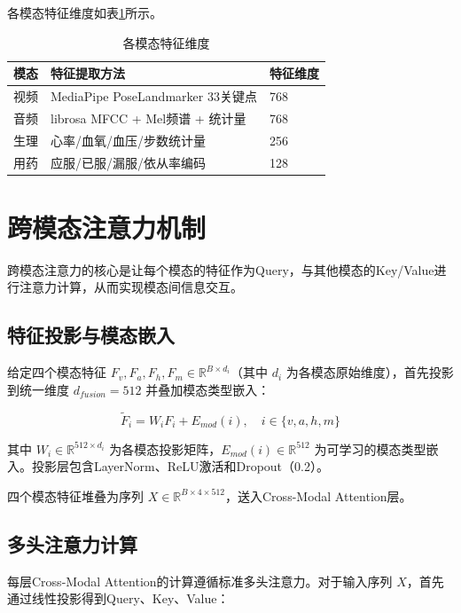 各模态特征维度如表\ref{tab:dims}所示。

\begin{table}[H]
\centering
\caption{各模态特征维度}
\label{tab:dims}
\begin{tabular}{lll}
\toprule
模态 & 特征提取方法 & 特征维度 \\
\midrule
视频 & MediaPipe PoseLandmarker 33关键点 & 768 \\
音频 & librosa MFCC + Mel频谱 + 统计量 & 768 \\
生理 & 心率/血氧/血压/步数统计量 & 256 \\
用药 & 应服/已服/漏服/依从率编码 & 128 \\
\bottomrule
\end{tabular}
\end{table}

\section{跨模态注意力机制}
\label{sec:crossattn}

跨模态注意力的核心是让每个模态的特征作为Query，与其他模态的Key/Value进行注意力计算，从而实现模态间信息交互。

\subsection{特征投影与模态嵌入}

给定四个模态特征 $F_v, F_a, F_h, F_m \in \mathbb{R}^{B \times d_i}$（其中 $d_i$ 为各模态原始维度），首先投影到统一维度 $d_{fusion}=512$ 并叠加模态类型嵌入：

\begin{equation}
\tilde{F}_i = W_i F_i + E_{mod}(i), \quad i \in \{v, a, h, m\}
\label{eq:proj}
\end{equation}

其中 $W_i \in \mathbb{R}^{512 \times d_i}$ 为各模态投影矩阵，$E_{mod}(i) \in \mathbb{R}^{512}$ 为可学习的模态类型嵌入。投影层包含LayerNorm、ReLU激活和Dropout（0.2）。

四个模态特征堆叠为序列 $X \in \mathbb{R}^{B \times 4 \times 512}$，送入Cross-Modal Attention层。

\subsection{多头注意力计算}

每层Cross-Modal Attention的计算遵循标准多头注意力\cite{vaswani2017attention}。对于输入序列 $X$，首先通过线性投影得到Query、Key、Value：

